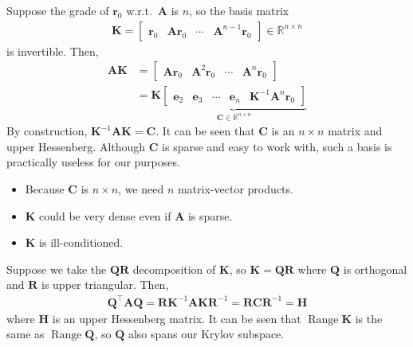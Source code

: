 \documentclass[12pt,a4paper]{article} %
\DeclareMathOperator{\Range}{Range}
\begin{document}
Suppose the grade of $\bm r_0$ w.r.t.\ $\mathbf A$ is $n$, so the basis matrix 
\begin{align*}
    \mathbf K = \begin{bmatrix}
        \bm r_0 & \mathbf A \bm r_0 & \cdots & \mathbf A^{n-1}\bm r_0
    \end{bmatrix} \in \mathbb R^{n \times n}
\end{align*}
is invertible. Then, 
\begin{align*}
    \mathbf A \mathbf K &= \begin{bmatrix}
        \mathbf A\bm r_0 & \mathbf A^2 \bm r_0 & \cdots & \mathbf A^{n}\bm r_0
    \end{bmatrix} \\ 
    &= \mathbf K \underbrace{\begin{bmatrix}
        \bm e_2 & \bm e_3 & \cdots & \bm e_n & \mathbf K^{-1} \mathbf A^n \bm r_0
    \end{bmatrix}}_{\mathbf C \in \mathbb R^{n \times n}}
\end{align*}
By construction, $\mathbf K^{-1} \mathbf A \mathbf K = \mathbf C$. It can be seen that 
$\mathbf C$ is an $n \times n$ matrix and upper Hessenberg.
Although $\mathbf C$ is sparse and easy to work with, such a basis is practically
useless for our purposes. 
\begin{itemize}
    \item Because $\mathbf C$ is $n \times n$, we need $n$ matrix-vector products.
    \item $\mathbf K$ could be very dense even if $\mathbf A$ is sparse. 
    \item $\mathbf K$ is ill-conditioned.
\end{itemize}

Suppose we take the $\mathbf Q \mathbf R$ decomposition of $\mathbf K$, so 
$\mathbf {K} = \mathbf {QR}$ where $\mathbf Q$ is orthogonal and $\mathbf R$ is 
upper triangular. Then, 
\begin{align*}
    \mathbf{Q}^{\top} \mathbf{A} \mathbf{Q}=\mathbf{R} \mathbf{K}^{-1} \mathbf{A} \mathbf{K} \mathbf{R}^{-1}=\mathbf{R} \mathbf{C} \mathbf{R}^{-1} = \mathbf{H}
\end{align*}
where $\mathbf H$ is an upper Hessenberg matrix. 
It can be seen that $\Range \mathbf K$ is the same as $\Range \mathbf Q$,
 so $\mathbf Q$ also 
spans our Krylov subspace.
\end{document}
